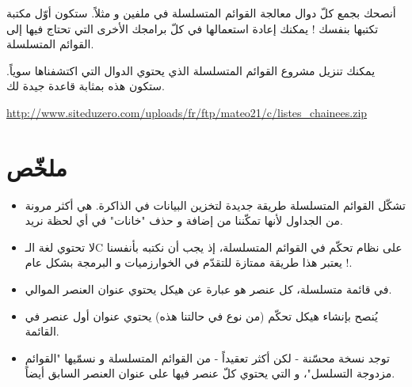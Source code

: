 أنصحك بجمع كلّ دوال معالجة القوائم المتسلسلة في ملفين 
و
مثلاً. ستكون أوّل مكتبة تكتبها بنفسك ! يمكنك إعادة استعمالها في كلّ برامجك الأخرى التي تحتاج فيها إلى القوائم المتسلسلة.

يمكنك تنزيل مشروع القوائم المتسلسلة الذي يحتوي الدوال التي اكتشفناها سوياً. ستكون هذه بمثابة قاعدة جيدة لك.

\url{http://www.siteduzero.com/uploads/fr/ftp/mateo21/c/listes_chainees.zip}

\section*{ملخّص}

\begin{itemize}
	\item تشكّل القوائم المتسلسلة طريقة جديدة لتخزين البيانات في الذاكرة. هي أكثر مرونة من الجداول لأنها تمكّننا من إضافة و حذف "خانات" في أي لحظة نريد.
	\item لا تحتوي لغة الـ\textenglish{C}
	على نظام تحكّم في القوائم المتسلسلة، إذ يجب أن نكتبه بأنفسنا ! يعتبر هذا طريقة ممتازة للتقدّم في الخوارزميات و البرمجة بشكل عام.
	\item في قائمة متسلسلة، كل عنصر هو عبارة عن هيكل يحتوي عنوان العنصر الموالي.
	\item يُنصح بإنشاء هيكل تحكّم (من نوع
	في حالتنا هذه) يحتوي عنوان أول عنصر في القائمة.
	\item توجد نسخة محسّنة - لكن أكثر تعقيداً - من القوائم المتسلسلة و نسمّيها "القوائم مزدوجة التسلسل"، و التي يحتوي كلّ عنصر فيها على عنوان العنصر السابق أيضاً.
\end{itemize}
